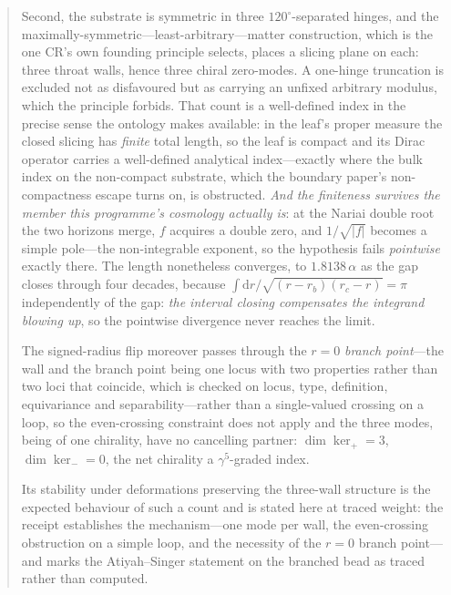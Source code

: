 \documentclass[11pt]{article}
\newcommand{\dd}{\mathrm{d}}
\begin{document}
\begin{abstract}
Second, the substrate is symmetric in three $120^\circ$-separated hinges, and the maximally-symmetric---least-arbitrary---matter construction, which is the one CR's own founding principle selects, places a slicing plane on each: three throat walls, hence three chiral zero-modes. A one-hinge truncation is excluded not as disfavoured but as carrying an unfixed arbitrary modulus, which the principle forbids. That count is a well-defined index in the precise sense the ontology makes available: in the leaf's proper measure the closed slicing has \emph{finite} total length, so the leaf is compact and its Dirac operator carries a well-defined analytical index---exactly where
the bulk index on the non-compact substrate, which the boundary paper's non-compactness escape turns on, is obstructed. \emph{And the finiteness survives the member this programme's cosmology actually is}: at the Nariai double root the two horizons merge, $f$ acquires a double zero, and $1/\sqrt{|f|}$ becomes a simple pole---the non-integrable exponent, so the hypothesis fails \emph{pointwise} exactly there. The length nonetheless converges, to $1.8138\,\alpha$ as the gap closes through four decades, because $\int\dd r/\sqrt{(r-r_b)(r_c-r)}=\pi$ independently of the gap: \emph{the interval closing compensates the integrand blowing up}, so the pointwise divergence never reaches the limit. 

The signed-radius flip moreover passes through the $r=0$ \emph{branch point}---the wall and the branch point being one locus with two properties rather than two loci that coincide, which is checked on locus, type, definition, equivariance and separability---rather than a single-valued crossing on a loop, so the even-crossing constraint does not apply and the three modes, being of one chirality, have no cancelling partner: $\dim\ker_+=3$, $\dim\ker_-=0$, the net chirality a $\gamma^5$-graded index. 

Its stability under deformations preserving the three-wall structure is the expected behaviour of such a count and is stated here at traced weight: the receipt establishes the mechanism---one mode per wall, the even-crossing obstruction on a simple loop, and the necessity of the $r=0$ branch point---and marks the Atiyah--Singer statement on the branched bead as traced rather than computed. 


\end{abstract}
\end{document}
